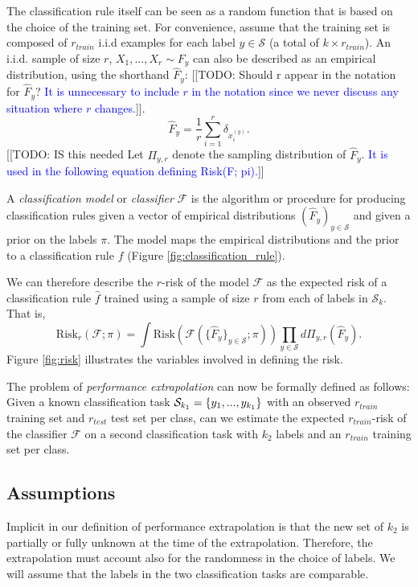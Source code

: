 \documentclass[12pt]{article}
\begin{document}
The classification rule itself can be seen as a random function that is based on the choice of the training set. For convenience, assume that the training set is composed of $r_{train}$ 
i.i.d examples for each label $y \in \mathcal{S}$ (a total of $k\times r_{train}$).
An i.i.d. sample of size $r$, $X_1,\hdots, X_r \sim F_y$ can also be described 
as an empirical distribution, using the shorthand $\hat{F}_y$: [[TODO: Should r appear in the notation for $\hat{F}_y$? \textcolor{blue}{It is unnecessary to include $r$ in the notation since we never discuss any situation where $r$ changes.}]].
\[\hat{F}_y = \frac{1}{r}\sum_{i=1}^r \delta_{x_i^{(y)}}.\]
[[TODO: IS this needed Let $\Pi_{y, r}$ denote the sampling distribution of $\hat{F}_y$. \textcolor{blue}{It is used in the following equation defining Risk(F; pi).}]]

A \emph{classification model} or \emph{classifier} $\mathcal{F}$ is the 
algorithm or procedure for producing classification rules given a 
vector of empirical distributions $(\hat{F}_y)_{y\in \mathcal{S}}$ and given a prior on the labels $\pi$.
The model maps the empirical distributions and the prior to a classification rule $f$ (Figure \ref{fig:classification_rule}).

We can therefore describe the $r$-risk of the model $\mathcal{F}$
as the expected risk of a classification rule $\hat{f}$ trained 
using a sample of size $r$ from each of labels in $\mathcal{S}_k$.
That is,
\[
\text{Risk}_r(\mathcal{F}; \pi) =
\int \text{Risk}(\mathcal{F}(\{\hat{F}_y\}_{y \in \mathcal{S}};
\pi)) \prod_{y \in \mathcal{S}} d\Pi_{y, r}(\hat{F}_y).
\]
Figure \ref{fig:risk} illustrates the variables involved in defining
the risk.

The problem of \emph{performance extrapolation} can now be formally defined as follows:
Given a known classification task $\mathcal{S}_{k_1}=\{y_1,...,y_{k_1}\}$ with an observed $r_{train}$ training set and $r_{test}$ test set per class, 
can we estimate the expected $r_{train}$-risk of the classifier $\mathcal{F}$ on a second classification task with $k_2$ labels and an $r_{train}$ training set per class.

\subsection{Assumptions}

Implicit in our definition of performance extrapolation is that the new set of $k_2$ is partially
or fully unknown at the time of the extrapolation. Therefore, 
the extrapolation must account also for the randomness in the choice of labels. We will assume that the labels in the two classification 
tasks are comparable. 
\end{document}
